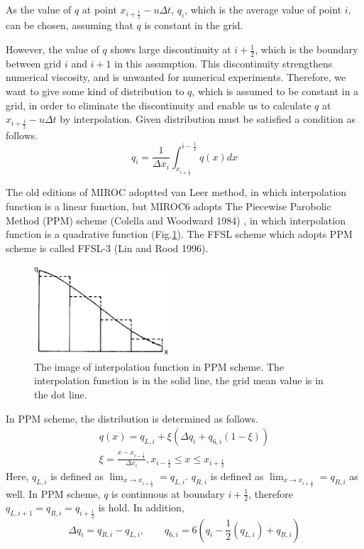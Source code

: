 \documentclass{article}
\begin{document}
As the value of $q$ at point $x_{i+\frac{1}{2}}-u\Delta t$, $q_{i}$, which is the average value of point $i$, can be chosen, assuming that $q$ is constant in the grid. 

However, the value of $q$ shows large discontinuity at $i+\frac{1}{2}$, which is the boundary between grid $i$ and $i+1$ in this assumption.
This discontinuity strengthens numerical viscosity, and is unwanted for numerical experiments. 
Therefore, we want to give some kind of distribution to $q$, which is assumed to be constant in a grid, in order to eliminate the discontinuity and enable us to calculate $q$ at $x_{i+\frac{1}{2}}-u\Delta t$ by interpolation.
Given distribution must be satisfied a condition as follows.
\begin{equation}
  q_{i}=\frac{1}{\Delta x_{i}} \int_{x_{i+\frac{1}{2}}}^{i-\frac{1}{2}} q(x) dx
\end{equation}

The old editions of MIROC adoptted van Leer method, in which interpolation function is a linear function, but MIROC6 adopts The Piecewise Parobolic Method (PPM) scheme (Colella and Woodward 1984) , in which interpolation function is a quadrative function (Fig.\ref{f1}). The FFSL scheme which adopts PPM scheme is called FFSL-3 (Lin and Rood 1996).

\begin{figure}
  \centering
  \includegraphics[width=5cm]{ppm_interpolate.png}
  \caption{The image of interpolation function in PPM scheme. The interpolation function is in the solid line, the grid mean value is in the dot line.}
  \label{f1}
\end{figure}

In PPM scheme, the distribution is determined as follows.
\begin{equation}
\begin{split}
\label{a4}
  q(x)=q_{L,i}+\xi (\Delta q_{i}+q_{6,i}(1-\xi))\\
  \xi=\frac{x-x_{i-\frac{1}{2}}}{\Delta x_{i}},  x_{i-\frac{1}{2}}\leq x \leq x_{i+\frac{1}{2}}
  \end{split}
\end{equation}
Here, $q_{L,i}$ is defined as $\lim_{x \to x_{i+\frac{1}{2}}}=q_{L,i}$.
$q_{R,i}$ is defined as $\lim_{x \to x_{i+\frac{1}{2}}}=q_{R,i}$ as well.
In PPM scheme, $q$ is continuous at boundary $i+\frac{1}{2}$, therefore $q_{L,i+1}=q_{R,i}=q_{i+\frac{1}{2}}$ is hold.
In addition, 
\begin{equation}
  \Delta q_{i}=q_{R,i}-q_{L,i},\qquad q_{6,i}=6(q_{i}-\frac{1}{2}(q_{L,i})+q_{R,i})
\end{equation}
\end{document}
